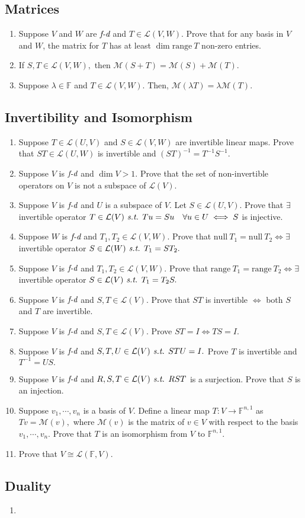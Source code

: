 \documentclass[11pt, letterpaper]{article}
\def\F{\mathbb{F}}
\def\L{\mathcal{L}}
\def\M{\mathcal{M}}
\def\st{\emph{ s.t. }}
\def\FD{\emph{f-d}}
\def\Null{\mathrm{null\ }}
\def\range{\mathrm{range\ }}
\begin{document}
\subsection{Matrices}
\begin{enumerate}
	\item Suppose $V$ and $W$ are $\FD$ and $T\in\L(V,W)$. Prove that for any basis in $V$ and $W$, the matrix for $T$ has at least $\dim\range T$ non-zero entries. 
	\item If $S,T\in\L(V,W),$ then $\M(S+T)=\M(S)+\M(T).$
	\item Suppose $\lambda\in\F$ and $T\in\L(V,W).$ Then, $\M(\lambda T)=\lambda\M(T).$
\end{enumerate}
\subsection{Invertibility and Isomorphism}
\begin{enumerate}
	\item Suppose $T\in\L(U,V)$ and $S\in\L(V,W)$ are invertible linear maps. Prove that $ST\in\L(U,W)$ is invertible and $(ST)^{-1}=T^{-1}S^{-1}.$
	\item Suppose $V$ is $\FD$ and $\dim V>1.$ Prove that the set of non-invertible operators on $V$ is not a subspace of $\L(V).$
	\item Suppose $V$ is $\FD$ and $U$ is a subspace of $V$. Let $S\in\L(U,V).$ Prove that $\exists$ invertible operator $T\in\L(V)\st Tu=Su\quad\forall u\in U\iff S$ is injective. 
	\item Suppose $W$ is $\FD$ and $T_1,T_2\in\L(V,W).$ Prove that $\Null T_1=\Null T_2\iff\exists$ invertible operator $S\in\L(W)\st T_1=ST_2.$
	\item Suppose $V$ is $\FD$ and $T_1,T_2\in\L(V,W).$ Prove that $\range T_1=\range T_2\iff\exists$ invertible operator $S\in\L(V)\st T_1=T_2S.$
	\item Suppose $V$ is $\FD$ and $S,T\in\L(V).$ Prove that $ST$ is invertible $\iff$ both $S$ and $T$ are invertible.
	\item Suppose $V$ is $\FD$ and $S,T\in\L(V).$ Prove $ST=I\iff TS=I.$
	\item Suppose $V$ is $\FD$ and $S,T,U\in\L(V)\st STU=I.$ Prove $T$ is invertible and $T^{-1}=US.$
	\item Suppose $V$ is $\FD$ and $R,S,T\in\L(V)\st RST$ is a surjection. Prove that $S$ is an injection. 
	\item Suppose $v_1,\cdots,v_n$ is a basis of $V$. Define a linear map $T:V\to\F^{n,1}$ as $Tv=\M(v),$ where $\M(v)$ is the matrix of $v\in V$ with respect to the basis $v_1,\cdots,v_n$. Prove that $T$ is an isomorphism from $V$ to $\F^{n,1}.$
	\item Prove that $V\cong\L(\F,V).$
\end{enumerate}
\subsection{Duality}
\begin{enumerate}
	\item 
\end{enumerate}
\end{document}

